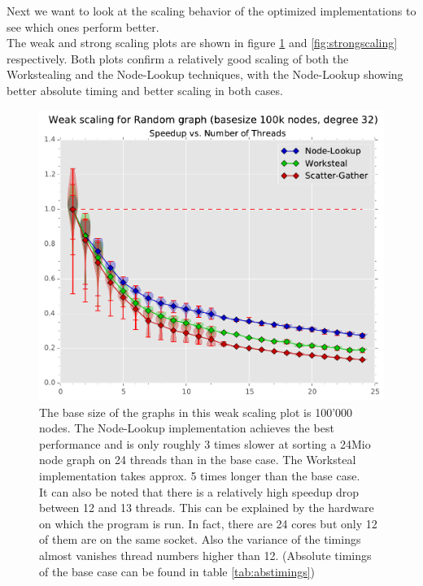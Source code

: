 Next we want to look at the scaling behavior of the optimized implementations to see which ones perform better. \\
The weak and strong scaling plots are shown in figure \ref{fig:weakscaling} and \ref{fig:strongscaling} respectively.
Both plots confirm a relatively good scaling of both the Workstealing and the Node-Lookup techniques, with the Node-Lookup showing better absolute timing and better scaling in both cases. \\
%
\begin{figure}[ht]
	\centering
	\includegraphics[width=\columnwidth]{plots/weakscaling_gtRANDOMLIN32_n1000000_deg32.pdf}
	\caption{The base size of the graphs in this weak scaling plot is 100'000 nodes.
		The Node-Lookup implementation achieves the best performance and is only roughly 3 times slower at sorting a 24Mio node graph on 24 threads than in the base case. The Worksteal implementation takes approx. 5 times longer than the base case. \\
	It can also be noted that there is a relatively high speedup drop between 12 and 13 threads.
	This can be explained by the hardware on which the program is run. In fact, there are 24 cores but only 12 of them are on the same socket.
	Also the variance of the timings almost vanishes thread numbers higher than 12. (Absolute timings of the base case can be found in table \ref{tab:abstimings})
}
	\label{fig:weakscaling}
\end{figure}
%

